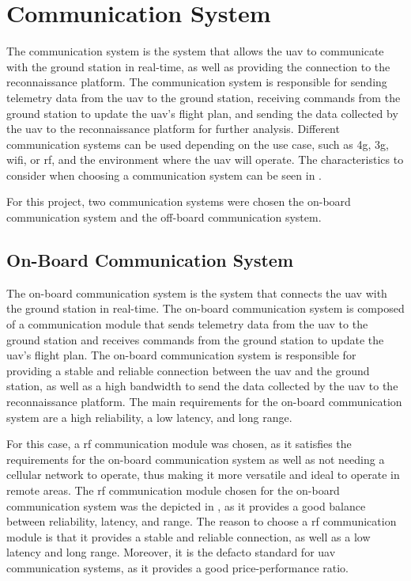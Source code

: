 \section{Communication System}\label{sec:design_communication_system}

The communication system is the system that allows the \gls{uav} to communicate with the ground station in real-time, as well as providing the connection to the reconnaissance platform. The communication system is responsible for sending telemetry data from the \gls{uav} to the ground station, receiving commands from the ground station to update the \gls{uav}'s flight plan, and sending the data collected by the \gls{uav} to the reconnaissance platform for further analysis. Different communication systems can be used depending on the use case, such as \gls{4g}, \gls{3g}, \gls{wifi}, or \gls{rf}, and the environment where the \gls{uav} will operate. The characteristics to consider when choosing a communication system can be seen in .


For this project, two communication systems were chosen the on-board communication system and the off-board communication system.

\subsection{On-Board Communication System}\label{subsec:on-board_communication_system}

The on-board communication system is the system that connects the \gls{uav} with the ground station in real-time. The on-board communication system is composed of a communication module that sends telemetry data from the \gls{uav} to the ground station and receives commands from the ground station to update the \gls{uav}'s flight plan. The on-board communication system is responsible for providing a stable and reliable connection between the \gls{uav} and the ground station, as well as a high bandwidth to send the data collected by the \gls{uav} to the reconnaissance platform. The main requirements for the on-board communication system are a high reliability, a low latency, and long range.

For this case, a \gls{rf} communication module was chosen, as it satisfies the requirements for the on-board communication system as well as not needing a cellular network to operate, thus making it more versatile and ideal to operate in remote areas. The \gls{rf} communication module chosen for the on-board communication system was the  depicted in , as it provides a good balance between reliability, latency, and range. The reason to choose a \gls{rf} communication module is that it provides a stable and reliable connection, as well as a low latency and long range. Moreover, it is the defacto standard for \gls{uav} communication systems, as it provides a good price-performance ratio.

